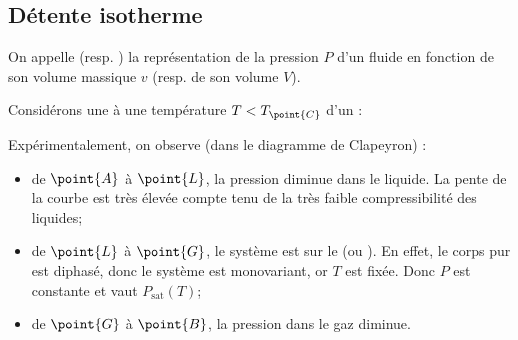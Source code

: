 \subsection{Détente isotherme}

\begin{definition}
On appelle  (resp. ) la représentation de la pression $P$ d'un fluide en fonction de son volume massique $v$ (resp. de son volume $V$).
\end{definition}

\begin{experience}
Considérons une  à une température $T < T_{\point{C}}$ d'un  :

\begin{figure}[H]
\begin{center}
\end{center}
\end{figure}

\noindent Expérimentalement, on observe (dans le diagramme de Clapeyron) :

\begin{figure}[H]
\begin{center}
\end{center}
\end{figure}

\begin{itemize}
\item de $\point{A}$ à $\point{L}$, la pression diminue dans le liquide. La pente de la courbe est très élevée compte tenu de la très faible compressibilité des liquides;
\item de $\point{L}$ à $\point{G}$, le système est sur le  (ou ). En effet, le corps pur est diphasé, donc le système est monovariant, or $T$ est fixée. Donc $P$ est constante et vaut $P_{\mathrm{sat}}(T)$;
\item de $\point{G}$ à $\point{B}$, la pression dans le gaz diminue.
\end{itemize}
\end{experience}

